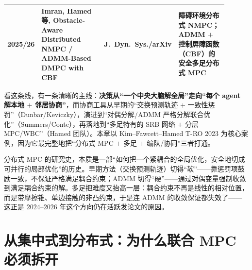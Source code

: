 \begin{table}[H]
\begin{tabular}{p{0.06\linewidth}p{0.40\linewidth}p{0.14\linewidth}p{0.30\linewidth}}
2025/26 & Imran, Hamed 等, Obstacle-Aware Distributed NMPC\cite{imran2025obstacle} / ADMM-Based DMPC with CBF\cite{zeng2026admmcbf} & J.\ Dyn.\ Sys./arXiv & 障碍环境分布式 NMPC；ADMM $+$ 控制屏障函数（CBF）的安全多足分布式 MPC \\
\bottomrule
\end{tabular}
\end{table}


看这条线，有一条清晰的主线：\textbf{决策从“一个中央大脑解全局”走向“每个 agent 解本地 $+$ 邻居协商”}，而协商工具从早期的“交换预测轨迹 $+$ 一致性惩罚”（Dunbar/Keviczky），演进到“对偶分解/ADMM 严格分解联合优化”（Summers/Conte），再落地到“多足特有的 SRB 网络 $+$ 分层 MPC/WBC”（Hamed 团队）。本章以 Kim--Fawcett--Hamed T-RO 2023\cite{kim2023layered} 为核心案例，因为它最完整地把“分布式 MPC $+$ 多足 $+$ 编队/协同”三者打通。

\begin{insight}[分布式 MPC 史 $=$ 一部“安全地切开紧耦合全局优化”的历史]\label{ins:dmpc-history}
分布式 MPC 的研究史，本质是一部“如何把一个紧耦合的全局优化，安全地切成可并行的局部优化”的历史。早期方法（交换预测轨迹）切得“软”——靠惩罚项鼓励一致，不保证严格满足耦合约束；ADMM 切得“硬”——通过对偶变量强制收敛到满足耦合约束的解。多足把难度又抬高一层：耦合约束不再是线性的相对位置，而是带摩擦锥、单边接触的非凸约束，于是连 ADMM 的收敛保证都失效了——这正是 $2024$–$2026$ 年这个方向仍在活跃发论文的原因。
\end{insight}

\section{从集中式到分布式：为什么联合 MPC 必须拆开}
\label{sec:dmpc-why}

